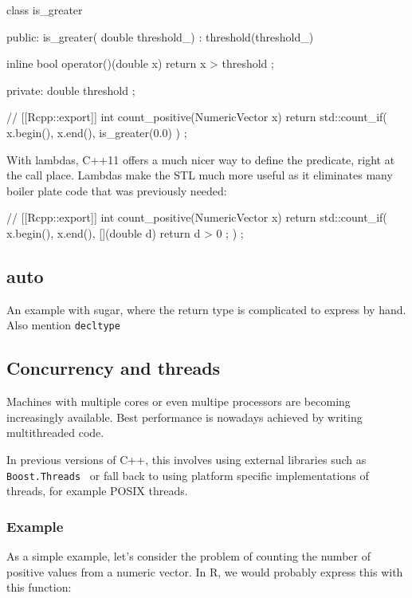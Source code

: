 \begin{example}
class is_greater {
public:
  is_greater( double threshold_) : threshold(threshold_){}
  
  inline bool operator()(double x){
    return x > threshold ;
  }
  
private:
  double threshold ;
}
// [[Rcpp::export]]
int count_positive(NumericVector x){
  return std::count_if( x.begin(), x.end(), is_greater(0.0) ) ;
}
\end{example}

With lambdas, C++11 offers a much nicer way to define the predicate, right at the 
call place. Lambdas make the STL much more useful as it eliminates 
many boiler plate code that was previously needed:

\begin{example}
// [[Rcpp::export]]
int count_positive(NumericVector x){
  return std::count_if( x.begin(), x.end(), 
    [](double d){ return d > 0 ;}
  ) ;
}
\end{example}


\subsection{auto}

An example with sugar, where the return type is complicated to express
by hand. Also mention \texttt{decltype}


\subsection{Concurrency and threads}

Machines with multiple cores or even multipe 
processors are becoming increasingly available. Best performance 
is nowadays achieved by writing multithreaded code. 

In previous versions of C++, this involves using external libraries 
such as \texttt{Boost.Threads}~\citep{KempfBoostThreads} 
or fall back to using platform specific 
implementations of threads, for example POSIX threads. 

\subsubsection{Example}

As a simple example, let's consider the problem of counting the number
of positive values from a numeric vector. In R, we would probably express this
with this function: 

